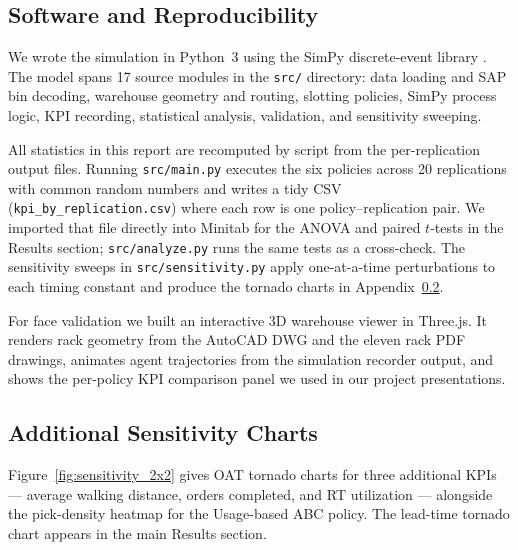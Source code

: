 \subsection{Software and Reproducibility}\label{sec:app_software}

We wrote the simulation in Python~3 using the SimPy discrete-event
library \cite{simpy}.  The model spans 17 source modules in the
\texttt{src/} directory: data loading and SAP bin decoding,
warehouse geometry and routing, slotting policies, SimPy process logic,
KPI recording, statistical analysis, validation, and sensitivity sweeping.

All statistics in this report are recomputed by script from the
per-replication output files.  Running \texttt{src/main.py} executes the six
policies across 20 replications with common random numbers and writes a
tidy CSV (\texttt{kpi\_by\_replication.csv}) where each row is one
policy--replication pair.  We imported that file directly into Minitab
for the ANOVA and paired $t$-tests in the Results section;
\texttt{src/analyze.py} runs the same tests as a cross-check.
The sensitivity sweeps in \texttt{src/sensitivity.py} apply
one-at-a-time perturbations to each timing constant and produce
the tornado charts in Appendix~\ref{sec:app_sensitivity}.

For face validation we built an interactive 3D warehouse viewer in Three.js.
It renders rack geometry from the AutoCAD DWG and the eleven rack PDF
drawings, animates agent trajectories from the simulation recorder output,
and shows the per-policy KPI comparison panel we used in our project
presentations.

\subsection{Additional Sensitivity Charts}\label{sec:app_sensitivity}

Figure~\ref{fig:sensitivity_2x2} gives OAT tornado charts for three
additional KPIs --- average walking distance, orders completed, and RT
utilization --- alongside the pick-density heatmap for the Usage-based ABC
policy.  The lead-time tornado chart appears in the main Results section.

